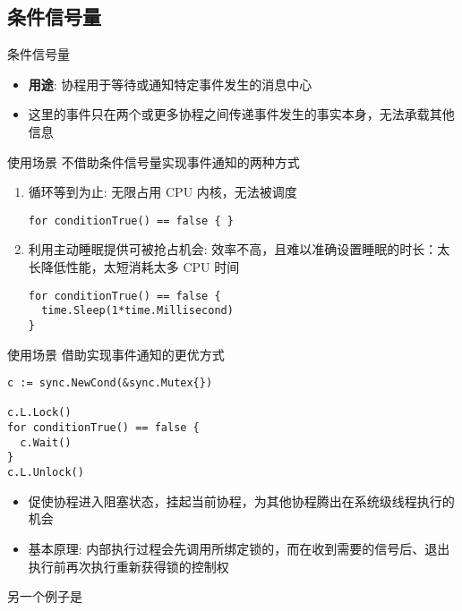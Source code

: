 \subsection{条件信号量\Cond}
\begin{frame}{条件信号量\Cond}
    \begin{itemize}
        \item \textbf{用途}: 协程用于等待或通知特定事件发生的\alert{消息中心}
        \item 这里的事件只在两个或更多协程之间传递事件发生的事实本身，\alert{无法承载其他信息}
    \end{itemize}
\end{frame}

\begin{frame}[fragile]{使用场景}
   不借助条件信号量实现事件通知的两种方式
   
   \begin{enumerate}
       \item {}循环等到为止: 无限占用 CPU 内核，\alert{无法被调度}
\begin{lstlisting}
for conditionTrue() == false { }    
\end{lstlisting}
       \item 利用主动睡眠提供可被抢占机会: \alert{效率不高，且难以准确设置睡眠的时长}：太长降低性能，太短消耗太多 CPU 时间    
\begin{lstlisting}
for conditionTrue() == false {
  time.Sleep(1*time.Millisecond)
}
\end{lstlisting}
   \end{enumerate}
\end{frame}

\begin{frame}[fragile]{使用场景}
   借助\Cond 实现事件通知的更优方式
\begin{lstlisting}
c := sync.NewCond(&sync.Mutex{})

c.L.Lock()
for conditionTrue() == false {
  c.Wait()
}
c.L.Unlock()
\end{lstlisting}

\begin{itemize}
    \item {}促使协程进入阻塞状态，挂起当前协程，为其他协程腾出在系统级线程执行的机会
    \item \alert{基本原理}: 内部执行过程会先调用所绑定锁的，而在收到需要的信号后、退出执行前再次执行重新获得锁的控制权
\end{itemize}

另一个例子是
\end{frame}

